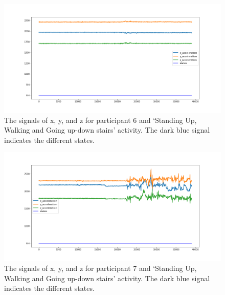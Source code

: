 \begin{figure}[H]
    \centering
    \begin{minipage}[b]{1\textwidth}
        \includegraphics[width=\textwidth]{manuscript/src/figures/Ass3/Ass3_Q2_states_user_5.png}
    \end{minipage}
    \caption{The signals of x, y, and z for participant 6 and ‘Standing  Up,  Walking  and  Going  up-down  stairs’ activity. The dark blue signal indicates the different states.}
    \label{fig:Ass3_Q2_states_user_5}
\end{figure}
\begin{figure}[H]
    \centering
    \begin{minipage}[b]{1\textwidth}
        \includegraphics[width=\textwidth]{manuscript/src/figures/Ass3/Ass3_Q2_states_user_6.png}
    \end{minipage}
    \caption{The signals of x, y, and z for participant 7 and ‘Standing  Up,  Walking  and  Going  up-down  stairs’ activity. The dark blue signal indicates the different states.}
    \label{fig:Ass3_Q2_states_user_6}
\end{figure}
